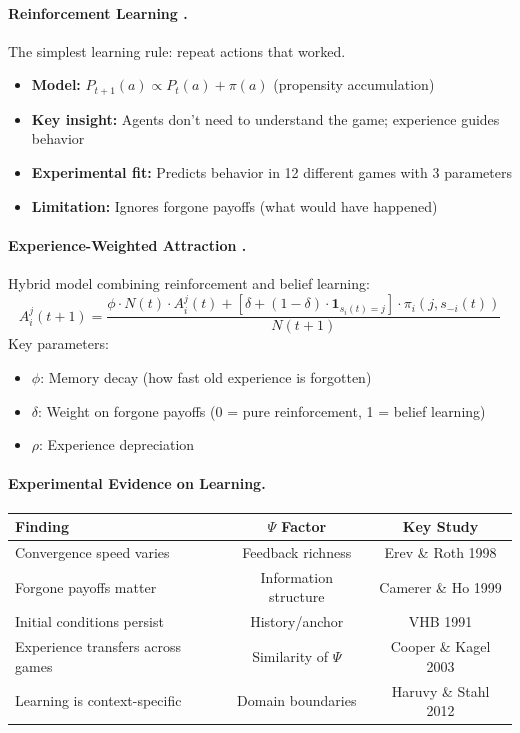 \paragraph{Reinforcement Learning \citep{roth1995learning,erev1998predicting}.}
The simplest learning rule: repeat actions that worked.
\begin{itemize}[nosep]
    \item \textbf{Model:} $P_{t+1}(a) \propto P_t(a) + \pi(a)$ (propensity accumulation)
    \item \textbf{Key insight:} Agents don't need to understand the game; experience guides behavior
    \item \textbf{Experimental fit:} Predicts behavior in 12 different games with 3 parameters
    \item \textbf{Limitation:} Ignores forgone payoffs (what would have happened)
\end{itemize}

\paragraph{Experience-Weighted Attraction \citep{camerer1999experience}.}
Hybrid model combining reinforcement and belief learning:
\begin{equation}
A_i^j(t+1) = \frac{\phi \cdot N(t) \cdot A_i^j(t) + [\delta + (1-\delta) \cdot \mathbf{1}_{s_i(t)=j}] \cdot \pi_i(j, s_{-i}(t))}{N(t+1)}
\tag{EV-EWA}
\end{equation}
Key parameters:
\begin{itemize}[nosep]
    \item $\phi$: Memory decay (how fast old experience is forgotten)
    \item $\delta$: Weight on forgone payoffs (0 = pure reinforcement, 1 = belief learning)
    \item $\rho$: Experience depreciation
\end{itemize}

\paragraph{Experimental Evidence on Learning.}
\begin{center}
\small
\begin{tabular}{@{}lcc@{}}
\toprule
\textbf{Finding} & \textbf{$\Psi$ Factor} & \textbf{Key Study} \\
\midrule
Convergence speed varies & Feedback richness & Erev \& Roth 1998 \\
Forgone payoffs matter & Information structure & Camerer \& Ho 1999 \\
Initial conditions persist & History/anchor & VHB 1991 \\
Experience transfers across games & Similarity of $\Psi$ & Cooper \& Kagel 2003 \\
Learning is context-specific & Domain boundaries & Haruvy \& Stahl 2012 \\
\bottomrule
\end{tabular}
\end{center}

